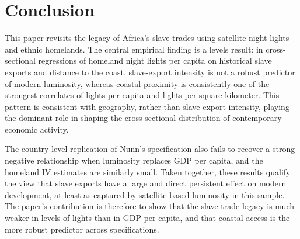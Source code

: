 \documentclass[12pt]{article}
\begin{document}
\section{Conclusion}
\label{sec:conclusion}

This paper revisits the legacy of Africa's slave trades using satellite night lights and ethnic homelands. The central empirical finding is a levels result: in cross-sectional regressions of homeland night lights per capita on historical slave exports and distance to the coast, slave-export intensity is not a robust predictor of modern luminosity, whereas coastal proximity is consistently one of the strongest correlates of lights per capita and lights per square kilometer. This pattern is consistent with geography, rather than slave-export intensity, playing the dominant role in shaping the cross-sectional distribution of contemporary economic activity.

The country-level replication of Nunn's specification also fails to recover a strong negative relationship when luminosity replaces GDP per capita, and the homeland IV estimates are similarly small. Taken together, these results qualify the view that slave exports have a large and direct persistent effect on modern development, at least as captured by satellite-based luminosity in this sample. The paper's contribution is therefore to show that the slave-trade legacy is much weaker in levels of lights than in GDP per capita, and that coastal access is the more robust predictor across specifications.

\newpage
\appendix
\end{document}
